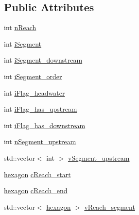 \subsection*{Public Attributes}
\begin{DoxyCompactItemize}
\item 
int \hyperlink{classhexwatershed_1_1segment_a9115344c54333df599c6d14cc14caf29}{n\-Reach}
\item 
int \hyperlink{classhexwatershed_1_1segment_ae39d97817c7a2e1a362f3d425d060522}{i\-Segment}
\item 
int \hyperlink{classhexwatershed_1_1segment_a55819810ead509866cf5487ea743214a}{i\-Segment\-\_\-downstream}
\item 
int \hyperlink{classhexwatershed_1_1segment_a2d26dfcbee67b2a7e8cff0800967585c}{i\-Segment\-\_\-order}
\item 
int \hyperlink{classhexwatershed_1_1segment_ad1f98a6311bc0431f225a78527f3d74f}{i\-Flag\-\_\-headwater}
\item 
int \hyperlink{classhexwatershed_1_1segment_aa66f1c654fe5c5ed5de764680ace6a4b}{i\-Flag\-\_\-has\-\_\-upstream}
\item 
int \hyperlink{classhexwatershed_1_1segment_a3359788cdb16f704cee42480e73efb82}{i\-Flag\-\_\-has\-\_\-downstream}
\item 
int \hyperlink{classhexwatershed_1_1segment_a0658a0988d360f55942787f8b99096e6}{n\-Segment\-\_\-upstream}
\item 
std\-::vector$<$ int $>$ \hyperlink{classhexwatershed_1_1segment_aa318d66f1d6a6d0f7022ad3b4e1485c8}{v\-Segment\-\_\-upstream}
\item 
\hyperlink{classhexwatershed_1_1hexagon}{hexagon} \hyperlink{classhexwatershed_1_1segment_af085a918d896be0ee619429917ba00d2}{c\-Reach\-\_\-start}
\item 
\hyperlink{classhexwatershed_1_1hexagon}{hexagon} \hyperlink{classhexwatershed_1_1segment_a096404720cd3c8245ea3dcf5638e6e2e}{c\-Reach\-\_\-end}
\item 
std\-::vector$<$ \hyperlink{classhexwatershed_1_1hexagon}{hexagon} $>$ \hyperlink{classhexwatershed_1_1segment_af1d6dedc2a40652967be4b88e3e56882}{v\-Reach\-\_\-segment}
\end{DoxyCompactItemize}


